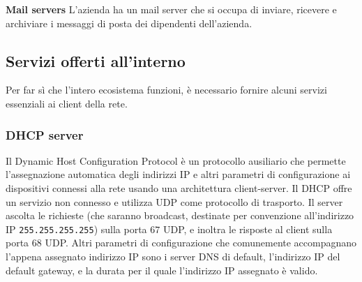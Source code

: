 \noindent \textbf{Mail servers}
L'azienda ha un mail server che si occupa di inviare, ricevere e archiviare i messaggi di posta dei dipendenti dell'azienda.

\subsection{Servizi offerti all'interno}
Per far sì che l'intero ecosistema funzioni, è necessario fornire alcuni servizi essenziali ai client della rete.
\subsubsection{DHCP server}
Il Dynamic Host Configuration Protocol \cite[RFC2131]{RFC2131} è un protocollo ausiliario che permette l'assegnazione automatica degli indirizzi IP e altri parametri di configurazione ai dispositivi connessi alla rete usando una architettura client-server.
Il DHCP offre un servizio non connesso e utilizza UDP come protocollo di trasporto. Il server ascolta le richieste (che saranno broadcast, destinate per convenzione all'indirizzo IP \texttt{255.255.255.255}) sulla porta $67$ UDP, e inoltra le risposte al client sulla porta $68$ UDP.
Altri parametri di configurazione che comunemente accompagnano l'appena assegnato indirizzo IP sono i server DNS \cite[RFC1034]{RFC1034} di default, l'indirizzo IP del default gateway, e la durata per il quale l'indirizzo IP assegnato è valido.

